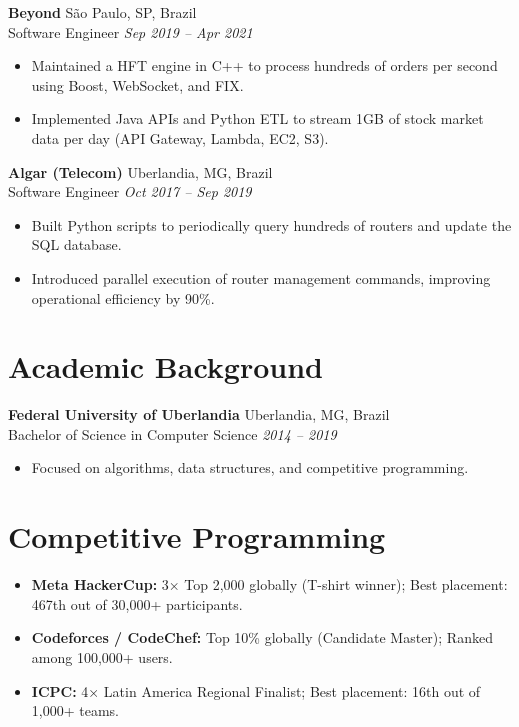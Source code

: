 \documentclass[a4paper,10pt]{article}
\begin{document}
\textbf{Beyond}
    \hfill São Paulo, SP, Brazil 
    \\ Software Engineer
    \hfill \textit{Sep 2019 – Apr 2021}
\begin{itemize}
    \item Maintained a HFT engine in C++ to process hundreds of orders per second using Boost, WebSocket, and FIX.
    \item Implemented Java APIs and Python ETL to stream 1GB of stock market data per day (API Gateway, Lambda, EC2, S3).
\end{itemize}

\textbf{Algar (Telecom)}
    \hfill Uberlandia, MG, Brazil 
    \\ Software Engineer
    \hfill \textit{Oct 2017 – Sep 2019}
\begin{itemize}
    \item Built Python scripts to periodically query hundreds of routers and update the SQL database.
    \item Introduced parallel execution of router management commands, improving operational efficiency by 90\%.
\end{itemize}

\section*{Academic Background}

\textbf{Federal University of Uberlandia} 
    \hfill Uberlandia, MG, Brazil
    \\Bachelor of Science in Computer Science
    \hfill \textit{2014 – 2019}
\begin{itemize}
    \item Focused on algorithms, data structures, and competitive programming.
\end{itemize}

\section*{Competitive Programming}
\begin{itemize}
    \item \textbf{Meta HackerCup:} 3× Top 2,000 globally (T-shirt winner); Best placement: 467th out of 30,000+ participants.
    \item \textbf{Codeforces / CodeChef:} Top 10\% globally (Candidate Master); Ranked among 100,000+ users.
    \item \textbf{ICPC:} 4× Latin America Regional Finalist; Best placement: 16th out of 1,000+ teams.
\end{itemize}
\end{document}
